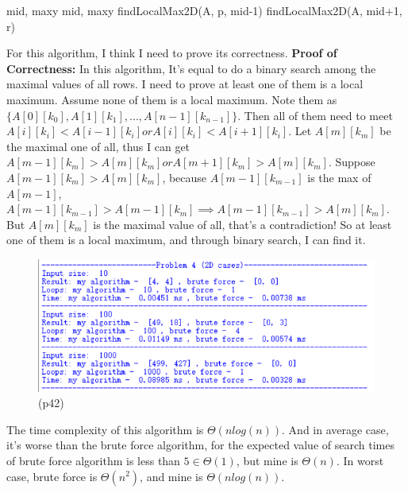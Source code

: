 \documentclass{article}       %
\begin{document}
\begin{enumerate}
\begin{enumerate}
\begin{algorithm}[H]
\begin{algorithmic}[1]
				\State \Return mid, maxy
				\EndIf
				\State \Return mid, maxy
				\EndIf
				\State \Return findLocalMax2D(A, p, mid-1)
				\EndIf
				\State \Return findLocalMax2D(A, mid+1, r)
				\EndIf
				\EndProcedure
			\end{algorithmic}\label{p4}
		\end{algorithm}		
	\end{enumerate}
	For this algorithm, I think I need to prove its correctness.\newline
	\textbf{Proof of Correctness:} In this algorithm, It's equal to do a binary search among the maximal values of all rows. I need to prove at least one of them is a local maximum.\newline
	Assume none of them is a local maximum. Note them as $\{A[0][k_0], A[1][k_1], ..., A[n-1][k_{n-1}]\}$. Then all of them need to meet $A[i][k_i] < A[i-1][k_i] or A[i][k_i] < A[i+1][k_i]$. Let $A[m][k_m]$ be the maximal one of all, thus I can get $A[m-1][k_m] > A[m][k_m] or A[m+1][k_m] > A[m][k_m]$. Suppose $A[m-1][k_m] > A[m][k_m]$, because $A[m-1][k_{m-1}]$ is the max of $A[m-1]$, $A[m-1][k_{m-1}] > A[m-1][k_m] \implies A[m-1][k_{m-1}] >  A[m][k_m]$. But  $A[m][k_m]$ is the maximal value of all, that's a contradiction!\newline
	So at least one of them is a local maximum, and through binary search, I can find it.\newline
	\begin{figure}[H]
		\centering
		\includegraphics[width=15cm]{p42}
		\caption{(p42)}
		\label{p42}
	\end{figure}
	The time complexity of this algorithm is $\Theta(nlog(n))$. And in average case, it's worse than the brute force algorithm, for the expected value of search times of brute force algorithm is less than $5\in \Theta(1)$, but mine is $\Theta (n)$. In worst case, brute force is $\Theta (n^2)$, and mine is $\Theta (nlog(n))$. 

\end{enumerate}
\end{document}
